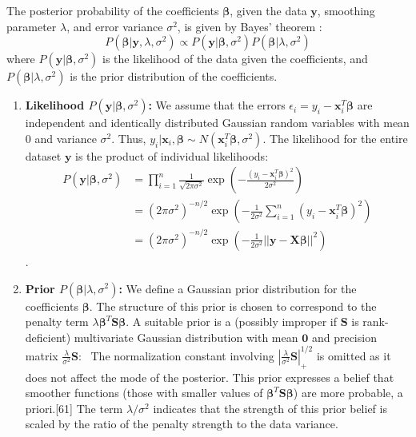 \documentclass[11pt, a4paper]{article}
\begin{document}
\begin{itemize}
The posterior probability of the coefficients $\boldsymbol{\beta}$, given the data $\mathbf{y}$, smoothing parameter $\lambda$, and error variance $\sigma^2$, is given by Bayes' theorem :
\[ P(\boldsymbol{\beta} | \mathbf{y}, \lambda, \sigma^2) \propto P(\mathbf{y} | \boldsymbol{\beta}, \sigma^2) P(\boldsymbol{\beta} | \lambda, \sigma^2) \]
where $P(\mathbf{y} | \boldsymbol{\beta}, \sigma^2)$ is the likelihood of the data given the coefficients, and $P(\boldsymbol{\beta} | \lambda, \sigma^2)$ is the prior distribution of the coefficients.

\begin{enumerate}
 \item \textbf{Likelihood $P(\mathbf{y} | \boldsymbol{\beta}, \sigma^2)$:}
 We assume that the errors $\epsilon_i = y_i - \mathbf{x}_i^T\boldsymbol{\beta}$ are independent and identically distributed Gaussian random variables with mean 0 and variance $\sigma^2$. Thus, $y_i | \mathbf{x}_i, \boldsymbol{\beta} \sim N(\mathbf{x}_i^T\boldsymbol{\beta}, \sigma^2)$. The likelihood for the entire dataset $\mathbf{y}$ is the product of individual likelihoods:
 \begin{align*}
 P(\mathbf{y} | \boldsymbol{\beta}, \sigma^2) &= \prod_{i=1}^n \frac{1}{\sqrt{2\pi\sigma^2}} \exp\left(-\frac{(y_i - \mathbf{x}_i^T\boldsymbol{\beta})^2}{2\sigma^2}\right) \\
 &= (2\pi\sigma^2)^{-n/2} \exp\left(-\frac{1}{2\sigma^2}\sum_{i=1}^n (y_i - \mathbf{x}_i^T\boldsymbol{\beta})^2\right) \\
 &= (2\pi\sigma^2)^{-n/2} \exp\left(-\frac{1}{2\sigma^2}||\mathbf{y} - \mathbf{X}\boldsymbol{\beta}||^2\right)
 \end{align*}
. 

 \item \textbf{Prior $P(\boldsymbol{\beta} | \lambda, \sigma^2)$:}
 We define a Gaussian prior distribution for the coefficients $\boldsymbol{\beta}$. The structure of this prior is chosen to correspond to the penalty term $\lambda \boldsymbol{\beta}^T \mathbf{S} \boldsymbol{\beta}$. A suitable prior is a (possibly improper if $\mathbf{S}$ is rank-deficient) multivariate Gaussian distribution with mean $\mathbf{0}$ and precision matrix $\frac{\lambda}{\sigma^2}\mathbf{S}$:
 \
 The normalization constant involving $|\frac{\lambda}{\sigma^2}\mathbf{S}|_+^{1/2}$ is omitted as it does not affect the mode of the posterior. This prior expresses a belief that smoother functions (those with smaller values of $\boldsymbol{\beta}^T\mathbf{S}\boldsymbol{\beta}$) are more probable, a priori.[61] The term $\lambda/\sigma^2$ indicates that the strength of this prior belief is scaled by the ratio of the penalty strength to the data variance.
\end{enumerate}


\end{itemize}
\end{document}
